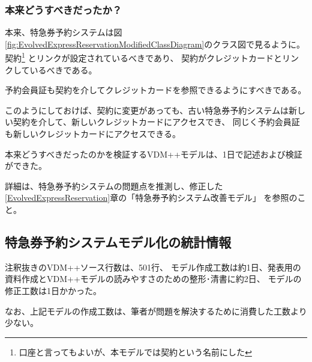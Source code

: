 	\subsubsection {本来どうすべきだったか？}
本来、特急券予約システムは図\ref{fig:EvolvedExpressReservationModifiedClassDiagram}のクラス図で見るように。
契約\footnote{口座と言ってもよいが、本モデルでは契約という名前にした}
とリンクが設定されているべきであり、
契約がクレジットカードとリンクしているべきである。

予約会員証も契約を介してクレジットカードを参照できるようにすべきである。

このようにしておけば、契約に変更があっても、古い特急券予約システムは新しい契約を介して、新しいクレジットカードにアクセスでき、
同じく予約会員証も新しいクレジットカードにアクセスできる。

本来どうすべきだったのかを検証するVDM++モデルは、1日で記述および検証ができた。

詳細は、特急券予約システムの問題点を推測し、修正した\ref{EvolvedExpressReservation}章の「特急券予約システム改善モデル」
を参照のこと。

%
%

\subsection {特急券予約システムモデル化の統計情報}
注釈抜きのVDM++ソース行数は、501行、
モデル作成工数は約1日、発表用の資料作成とVDM++モデルの読みやすさのための整形･清書に約2日、
モデルの修正工数は1日かかった。

なお、上記モデルの作成工数は、筆者が問題を解決するために消費した工数より少ない。